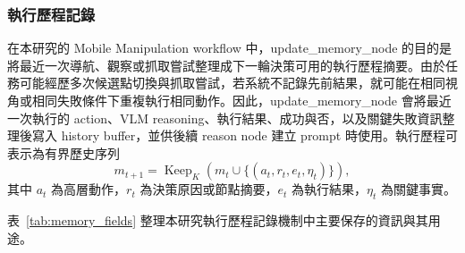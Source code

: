 \documentclass[12pt,a4paper]{article}
\begin{document}
\subsubsection{執行歷程記錄}

在本研究的 Mobile Manipulation workflow 中，update\_memory\_node 的目的是將最近一次導航、觀察或抓取嘗試整理成下一輪決策可用的執行歷程摘要。由於任務可能經歷多次候選點切換與抓取嘗試，若系統不記錄先前結果，就可能在相同視角或相同失敗條件下重複執行相同動作。因此，update\_memory\_node 會將最近一次執行的 action、VLM reasoning、執行結果、成功與否，以及關鍵失敗資訊整理後寫入 history buffer，並供後續 reason node 建立 prompt 時使用。執行歷程可表示為有界歷史序列
\begin{equation}
    m_{t+1}=\operatorname{Keep}_{K}\left(m_t\cup\{(a_t,r_t,e_t,\eta_t)\}\right),
\end{equation}
其中 $a_t$ 為高層動作，$r_t$ 為決策原因或節點摘要，$e_t$ 為執行結果，$\eta_t$ 為關鍵事實。

表~\ref{tab:memory_fields} 整理本研究執行歷程記錄機制中主要保存的資訊與其用途。
\end{document}

